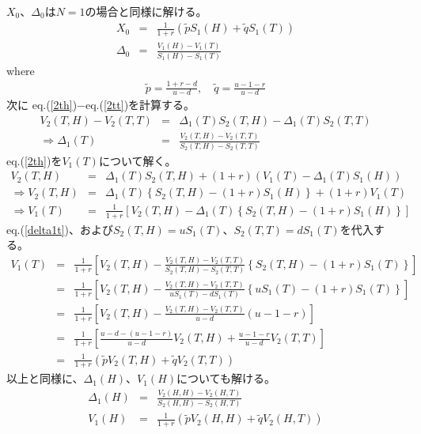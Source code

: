 \documentclass[10pt]{article}
\theoremstyle{plain}
\begin{document}
$X_0$、$\Delta_0$は$N=1$の場合と同様に解ける。
\begin{eqnarray}
    X_0     &=& \frac{1}{1+r}\left( \tilde{p}S_1(H)+\tilde{q}S_1(T) \right) \\
    \Delta_0&=& \frac{V_1(H)-V_1(T)}{S_1(H)-S_1(T)}
\end{eqnarray}
where
\begin{eqnarray}
\tilde{p}=\frac{1+r-d}{u-d},\quad  \tilde{q}=\frac{u-1-r}{u-d}
\end{eqnarray}
次に
eq.(\ref{2th})$-$eq.(\ref{2tt})を計算する。
\begin{eqnarray}
    V_2(T,H)-V_2(T,T) &=& \Delta_1(T) S_2(T,H)- \Delta_1(T) S_2(T,T)\\
    \Rightarrow \Delta_1(T) &=& \frac{V_2(T,H)-V_2(T,T)}{ S_2(T,H)- S_2(T,T)} \label{delta1t}
\end{eqnarray}
eq.(\ref{2th})を$V_1(T)$について解く。
\begin{eqnarray}
V_2(T,H) &=& \Delta_1(T) S_2(T,H) + (1+r)(V_1(T) - \Delta_1(T) S_1(H)) \\
\Rightarrow V_2(T,H)&=& \Delta_1(T)\left\{ S_2(T,H) -(1+r)S_1(H)\right\} + (1+r)V_1(T) \\
\Rightarrow V_1(T)&=& \frac{1}{1+r}\left[V_2(T,H) - \Delta_1(T)\left\{ S_2(T,H) -(1+r)S_1(H)\right\} \right]
\end{eqnarray}
eq.(\ref{delta1t})、および$S_2(T,H)=uS_1(T)$、$S_2(T,T)=dS_1(T)$を代入する。
\begin{eqnarray}
V_1(T)&=& \frac{1}{1+r}\left[V_2(T,H) - \frac{V_2(T,H)-V_2(T,T)}{ S_2(T,H)- S_2(T,T)}\left\{ S_2(T,H) -(1+r)S_1(T)\right\} \right] \\
&=& \frac{1}{1+r}\left[V_2(T,H) - \frac{V_2(T,H)-V_2(T,T)}{uS_1(T)- dS_1(T)}\left\{ uS_1(T) -(1+r)S_1(T)\right\} \right] \\
&=& \frac{1}{1+r}\left[V_2(T,H) - \frac{V_2(T,H)-V_2(T,T)}{u-d}(u-1-r) \right] \\
&=& \frac{1}{1+r}\left[\frac{u-d-(u-1-r)}{u-d}V_2(T,H) + \frac{u-1-r}{u-d}V_2(T,T) \right] \\
&=& \frac{1}{1+r}\left(\tilde{p}V_2(T,H) + \tilde{q}V_2(T,T) \right)
\end{eqnarray}
以上と同様に、$\Delta_1(H)$、$V_1(H)$についても解ける。
\begin{eqnarray}
\Delta_1(H) &=& \frac{V_2(H,H)-V_2(H,T)}{ S_2(H,H)- S_2(H,T)} \\
V_1(H)&=&  \frac{1}{1+r}\left(\tilde{p}V_2(H,H) + \tilde{q}V_2(H,T) \right)
\end{eqnarray}
\hrulefill \hspace{5cm}
\end{document}
